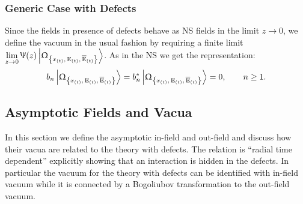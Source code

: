 \subsubsection{Generic Case with Defects}
    
Since the fields in presence of defects behave as NS fields in the limit $z \to 0$, we define the vacuum in the usual fashion by requiring a finite limit $\lim\limits_{z \to 0} \Psi( z ) \Gexcvacket$.
As in the NS we get the representation:
\begin{equation}
  b_{n} \Gexcvacket
  =
  b^*_{n} \Gexcvacket
  =
  0,
  \qquad n \ge 1.
  \label{eq:generic_vacuum}
\end{equation}


\subsection{Asymptotic Fields and Vacua}
\label{sect:asymp_fields}
    
In this section we define the asymptotic in-field and out-field and discuss how their vacua are related to the theory with defects.
The relation is ``radial time dependent'' explicitly showing that an interaction is hidden in the defects.
In particular the vacuum for the theory with defects can be identified with  in-field vacuum while it is connected by a Bogoliubov transformation to the  out-field vacuum.
    
